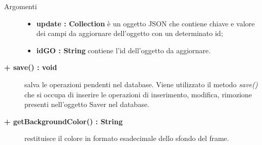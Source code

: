 \begin{description}
\begin{description}
\begin{description}
\begin{description}
			\item[Argomenti] \hfill
				\begin{itemize}
						\item \textbf{update : Collection			} \hfill
					è un oggetto JSON che contiene chiave e valore dei campi da aggiornare dell'oggetto con un determinato id;
					\item \textbf{idGO : String			} \hfill
					contiene l'id dell'oggetto da aggiornare.
				\end{itemize}

\end{description}

\end{description}

\begin{description}
		\item[\textbf{\color{blue}+ save() : void			}] \hfill
			salva le operazioni pendenti nel database. Viene utilizzato il metodo \textit{save()} che si occupa di inserire le operazioni di inserimento, modifica, rimozione presenti nell'oggetto Saver nel database. 

\end{description}

\begin{description} 
		\item[\textbf{\color{blue}+ getBackgroundColor() : String			}] \hfill
			restituisce il colore in formato esadecimale dello sfondo del frame.     

\end{description}



\end{description}

\end{description}


